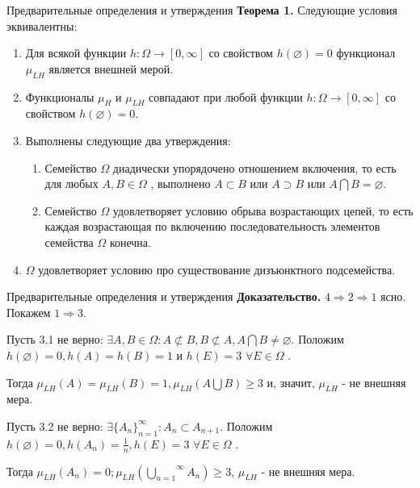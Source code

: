 \documentclass{beamer}
\begin{document}
\begin{frame}{Предварительные определения и утверждения}
      \textbf{Теорема 1.} Следующие условия эквивалентны:
      \begin{enumerate}
        \item Для всякой функции $h: \Omega \to [0, \infty]$ со свойством 
              $h(\varnothing) = 0$ функционал $\mu_{LH}$ является внешней мерой. 
        \item Функционалы $\mu_H$ и $\mu_{LH}$ совпадают  при любой функции 
              $h: \Omega \to [0, \infty]$ со свойством $h(\varnothing) = 0$.
        \item Выполнены следующие два утверждения:
              \begin{enumerate}
                    \item Семейство $\Omega$ диадически упорядочено отношением включения, 
                                     то есть для любых $A, B \in \Omega$ , выполнено $A \subset B $
                                     или $ A \supset B$ или $A \bigcap B = \varnothing$.
                    \item Семейство $\Omega$ удовлетворяет условию обрыва возрастающих цепей, 
                                     то есть каждая возрастающая по включению последовательность элементов
                                     семейства $\Omega$ конечна.
              \end{enumerate}
        \item $\Omega$ удовлетворяет условию про существование дизъюнктного подсемейства.
    \end{enumerate}
\end{frame}

% 
% 
% 
\begin{frame}{Предварительные определения и утверждения}
    \textbf{Доказательство.} $4 \Rightarrow 2 \Rightarrow 1$ ясно. Покажем $1 \Rightarrow 3$.
    \newline
      
    Пусть 3.1 не верно: $\exists A, B \in \Omega: A \not \subset B, B \not \subset A, 
    A \bigcap B \ne \varnothing$. Положим $h(\varnothing) = 0, h(A) = h(B) = 1$
    и $h(E) = 3$ $\forall E \in \Omega$ . 
      
    Тогда $\mu_{LH} (A) = \mu_{LH} (B) = 1, \mu_{LH} (A \bigcup B) \geq 3 $ 
    и, значит, $\mu_{LH}$ -  не внешняя мера.
    \newline
      
    Пусть 3.2 не верно: $\exists \{A_n\}_{n=1}^{\infty} : A_n \subset A_{n+1}$. 
    Положим $h(\varnothing) = 0, h(A_n) = \frac{1}{n}, h(E) = 3$
    $\forall E \in \Omega$ .
    
    Тогда $\mu_{LH} (A_n) = 0;
    \mu_{LH} (\overset{\infty}{\underset{n=1}{\bigcup}} A_n ) \geq 3 $,
    $\mu_{LH}$ - не внешняя мера.
\end{frame}
\end{document}
